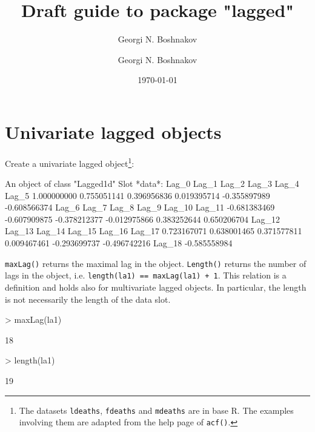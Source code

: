 \documentclass[a4paper,twoside,11pt,nojss,article]{jss}
\author{Georgi N. Boshnakov}
\author{Georgi N. Boshnakov}
\date{\today}
\title{Draft guide to package "lagged"}
\begin{document}
\maketitle



\section{Univariate lagged objects}
\label{sec:org3518898}

Create a univariate lagged object\footnote{The datasets \texttt{ldeaths}, \texttt{fdeaths} and \texttt{mdeaths} are in base R. The examples
involving them are adapted from the help page of \texttt{acf()}.}:
\begin{Schunk}
\begin{Soutput}
An object of class "Lagged1d"
Slot *data*: 
       Lag_0        Lag_1        Lag_2        Lag_3        Lag_4        Lag_5 
 1.000000000  0.755051141  0.396956836  0.019395714 -0.355897989 -0.608566374 
       Lag_6        Lag_7        Lag_8        Lag_9       Lag_10       Lag_11 
-0.681383469 -0.607909875 -0.378212377 -0.012975866  0.383252644  0.650206704 
      Lag_12       Lag_13       Lag_14       Lag_15       Lag_16       Lag_17 
 0.723167071  0.638001465  0.371577811  0.009467461 -0.293699737 -0.496742216 
      Lag_18 
-0.585558984 
\end{Soutput}
\end{Schunk}


\texttt{maxLag()} returns the maximal lag in the object. \texttt{Length()} returns the number of lags in the
object, i.e. \texttt{length(la1) == maxLag(la1) + 1}. This relation is a definition and holds also
for multivariate lagged objects. In particular, the length is not necessarily the
length of the data slot.
\begin{Schunk}
\begin{Sinput}
> maxLag(la1)
\end{Sinput}
\begin{Soutput}
[1] 18
\end{Soutput}
\begin{Sinput}
> length(la1)
\end{Sinput}
\begin{Soutput}
[1] 19
\end{Soutput}
\end{Schunk}
\end{document}
